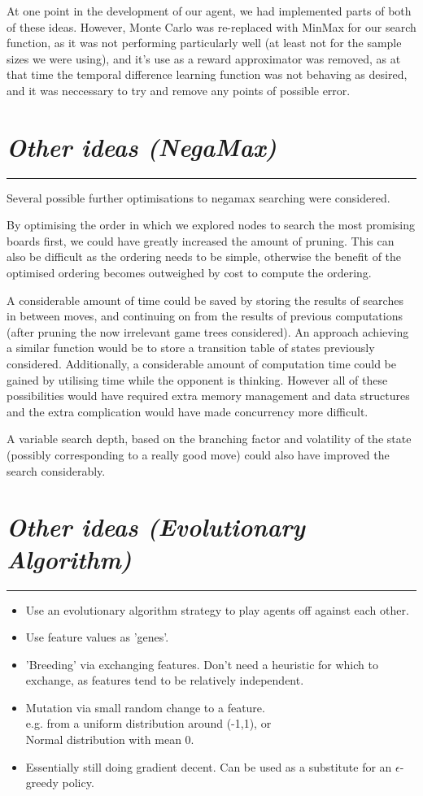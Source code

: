 \documentclass[10pt]{report}
\begin{document}
\begin{multicols}{2}
At one point in the development of our agent, we had implemented parts of both of these ideas. However, Monte Carlo was re-replaced with MinMax for our search function, as it was not performing particularly well (at least not for the sample sizes we were using), and it's use as a reward approximator was removed, as at that time the temporal difference learning function was not behaving as desired, and it was neccessary to try and remove any points of possible error.

\section*{\emph{Other ideas (NegaMax)}}
\hrule

Several possible further optimisations to negamax searching were considered.

By optimising the order in which we explored nodes to search the most promising boards first, we could have greatly increased the amount of pruning. This can also be difficult as the ordering needs to be simple, otherwise the benefit of the optimised ordering becomes outweighed by cost to compute the ordering.

A considerable amount of time could be saved by storing the results of searches in between moves, and continuing on from the results of previous computations (after pruning the now irrelevant game trees considered). An approach achieving a similar function would be to store a transition table of states previously considered. Additionally, a considerable amount of computation time could be gained by utilising time while the opponent is thinking. However all of these possibilities would have required extra memory management and data structures and the extra complication would have made concurrency more difficult.

A variable search depth, based on the branching factor and volatility of the state (possibly corresponding to a really good move) could also have improved the search considerably.
\section*{\emph{Other ideas (Evolutionary Algorithm)}}
\hrule
    \begin{itemize}
  \item
   	Use an evolutionary algorithm strategy to play agents off against each other.
  \item
	Use feature values as 'genes'.
  \item
	'Breeding' via exchanging features. Don't need a heuristic for which to exchange, as features tend to be relatively independent.
  \item
	Mutation via small random change to a feature.
	\\ e.g. from a uniform distribution around (-1,1), or
	\\ Normal distribution with mean 0.
  \item
	Essentially still doing gradient decent. Can be used as a substitute for an $\epsilon$-greedy policy.
  \end{itemize}
  

\end{multicols}
\end{document}
